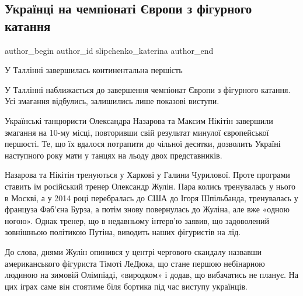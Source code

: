  
 
 
 
 
\subsection{Українці на чемпіонаті Європи з фігурного катання}
\label{sec:16_01_2022.stz.news.ua.zaxid.1.figurnoje_katanie_ukraina}

\ifcmt
 author_begin
   author_id slipchenko_katerina
 author_end
\fi

\begin{zznagolos}
У Таллінні завершилась континентальна першість
\end{zznagolos}

У Таллінні наближається до завершення чемпіонат Європи з фігурного катання. Усі
змагання відбулись, залишились лише показові виступи.

Українські танцюристи Олександра Назарова та Максим Нікітін завершили змагання
на 10-му місці, повторивши свій результат минулої європейської першості. Те, що
їх вдалося потрапити до чільної десятки, дозволить Україні наступного року мати
у танцях на льоду двох представників.


Назарова та Нікітін тренуються у Харкові у Галини Чурилової. Проте програми
ставить їм російський тренер Олександр Жулін. Пара колись тренувалась у нього в
Москві, а у 2014 році перебралась до США до Ігоря Шпільбанда, тренувалась у
француза Фаб’єна Бурза, а потім знову повернулась до Жуліна, але вже «одною
ногою». Однак тренер, що в недавньому інтерв’ю заявив, що задоволений
зовнішньою політикою Путіна, виводить наших фігуристів на лід.


До слова, днями Жулін опинився у центрі чергового скандалу назвавши
американського фігуриста Тімоті ЛеДюка, що стане першою небінарною людиною на
зимовій Олімпіаді, «виродком» і додав, що вибачатись не планує. На цих іграх
саме він стоятиме біля бортика під час виступу українців.

